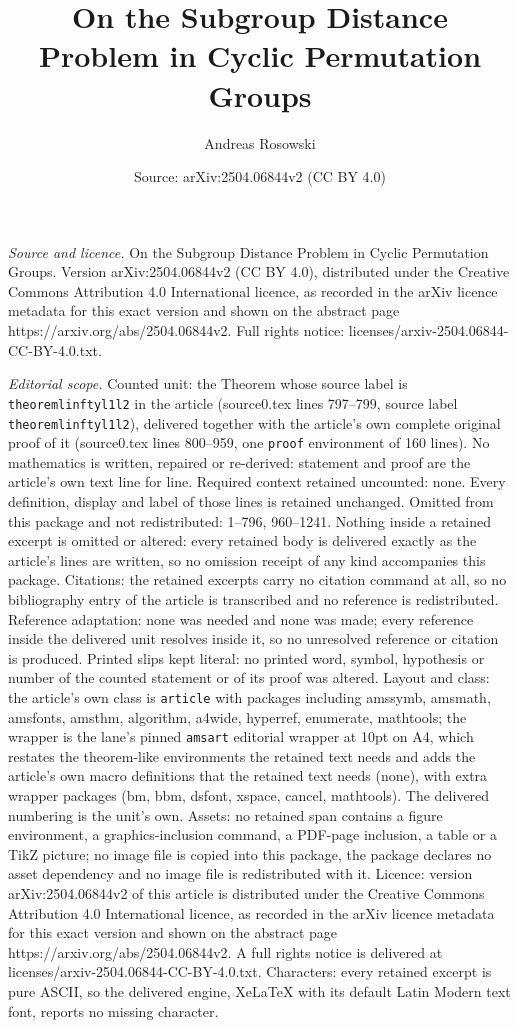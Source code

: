 \documentclass[10pt,a4paper]{amsart}
\title[On the Subgroup Distance Problem in Cyclic Permutation Group]{On the Subgroup Distance Problem in Cyclic Permutation Groups}
\author{Andreas Rosowski}
\date{Source: arXiv:2504.06844v2 (CC BY 4.0)}
\begin{document}
\maketitle

\noindent\emph{Source and licence.} On the Subgroup Distance Problem in Cyclic Permutation Groups. Version arXiv:2504.06844v2 (CC BY 4.0), distributed under the Creative Commons Attribution 4.0 International licence, as recorded in the arXiv licence metadata for this exact version and shown on the abstract page https://arxiv.org/abs/2504.06844v2. Full rights notice: licenses/arxiv-2504.06844-CC-BY-4.0.txt.\par\smallskip

\noindent\textit{Editorial scope.} Counted unit: the Theorem whose source label is \texttt{theoremlinftyl1l2} in the article (source0.tex lines 797--799, source label \texttt{theoremlinftyl1l2}), delivered together with the article's own complete original proof of it (source0.tex lines 800--959, one \texttt{proof} environment of 160 lines). No mathematics is written, repaired or re-derived: statement and proof are the article's own text line for line. Required context retained uncounted: none. Every definition, display and label of those lines is retained unchanged. Omitted from this package and not redistributed: 1--796, 960--1241. Nothing inside a retained excerpt is omitted or altered: every retained body is delivered exactly as the article's lines are written, so no omission receipt of any kind accompanies this package. Citations: the retained excerpts carry no citation command at all, so no bibliography entry of the article is transcribed and no reference is redistributed. Reference adaptation: none was needed and none was made; every reference inside the delivered unit resolves inside it, so no unresolved reference or citation is produced. Printed slips kept literal: no printed word, symbol, hypothesis or number of the counted statement or of its proof was altered. Layout and class: the article's own class is \texttt{article} with packages including amssymb, amsmath, amsfonts, amsthm, algorithm, a4wide, hyperref, enumerate, mathtools; the wrapper is the lane's pinned \texttt{amsart} editorial wrapper at 10pt on A4, which restates the theorem-like environments the retained text needs and adds the article's own macro definitions that the retained text needs (none), with extra wrapper packages (bm, bbm, dsfont, xspace, cancel, mathtools). The delivered numbering is the unit's own. Assets: no retained span contains a figure environment, a graphics-inclusion command, a PDF-page inclusion, a table or a TikZ picture; no image file is copied into this package, the package declares no asset dependency and no image file is redistributed with it. Licence: version arXiv:2504.06844v2 of this article is distributed under the Creative Commons Attribution 4.0 International licence, as recorded in the arXiv licence metadata for this exact version and shown on the abstract page https://arxiv.org/abs/2504.06844v2. A full rights notice is delivered at licenses/arxiv-2504.06844-CC-BY-4.0.txt. Characters: every retained excerpt is pure ASCII, so the delivered engine, XeLaTeX with its default Latin Modern text font, reports no missing character.
\end{document}

